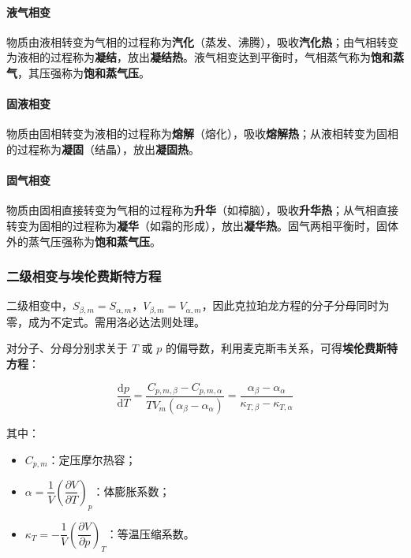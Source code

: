 \documentclass[UTF8]{ctexart}
\begin{document}
\paragraph{液气相变}
物质由液相转变为气相的过程称为\textbf{汽化}（蒸发、沸腾），吸收\textbf{汽化热}；由气相转变为液相的过程称为\textbf{凝结}，放出\textbf{凝结热}。液气相变达到平衡时，气相蒸气称为\textbf{饱和蒸气}，其压强称为\textbf{饱和蒸气压}。

\paragraph{固液相变}
物质由固相转变为液相的过程称为\textbf{熔解}（熔化），吸收\textbf{熔解热}；从液相转变为固相的过程称为\textbf{凝固}（结晶），放出\textbf{凝固热}。

\paragraph{固气相变}
物质由固相直接转变为气相的过程称为\textbf{升华}（如樟脑），吸收\textbf{升华热}；从气相直接转变为固相的过程称为\textbf{凝华}（如霜的形成），放出\textbf{凝华热}。固气两相平衡时，固体外的蒸气压强称为\textbf{饱和蒸气压}。

\subsubsection{二级相变与埃伦费斯特方程}

二级相变中，$S_{\beta,m}=S_{\alpha,m}$，$V_{\beta,m}=V_{\alpha,m}$，因此克拉珀龙方程的分子分母同时为零，成为不定式。需用洛必达法则处理。

对分子、分母分别求关于 $T$ 或 $p$ 的偏导数，利用麦克斯韦关系，可得\textbf{埃伦费斯特方程}：

\[
\boxed{\frac{\mathrm{d}p}{\mathrm{d}T}
=\frac{C_{p,m,\beta}-C_{p,m,\alpha}}{TV_m(\alpha_\beta-\alpha_\alpha)}
=\frac{\alpha_\beta-\alpha_\alpha}{\kappa_{T,\beta}-\kappa_{T,\alpha}}}
\]

其中：
\begin{itemize}[leftmargin=2em]
  \item $C_{p,m}$：定压摩尔热容；
  \item $\alpha=\dfrac{1}{V}\left(\dfrac{\partial V}{\partial T}\right)_p$：体膨胀系数；
  \item $\kappa_T=-\dfrac{1}{V}\left(\dfrac{\partial V}{\partial p}\right)_T$：等温压缩系数。
\end{itemize}

\end{document}
